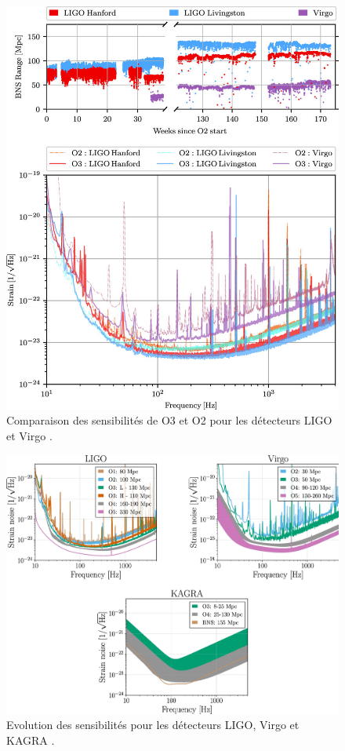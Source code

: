 \begin{figure}
  \centering
  \includegraphics[width=0.6\linewidth]{sectionDetection/sensitivity_comparison.png}
  \caption{Comparaison des sensibilités de O3 et O2 pour les détecteurs LIGO et Virgo \cite{ligo_characterization}.}
  \label{fig:sensitivity_comparison}
\end{figure}


\begin{figure}
  \centering
  \includegraphics[width=\linewidth]{sectionDetection/design_sensitivities.png}
  \caption{Evolution des sensibilités pour les détecteurs LIGO, Virgo et KAGRA \cite{prospects}.}
  \label{fig:design_sensitivities}
\end{figure}



